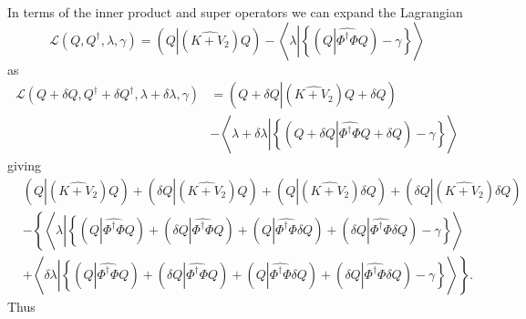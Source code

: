 \documentclass[aps,preprint]{revtex4}%
\begin{document}
In terms of the inner product and super operators we can expand the
Lagrangian
\begin{equation}
\mathcal{L}\left(  Q,Q^{\dagger},\lambda,\gamma\right)  =\left(  Q\left\vert
\left(  \widehat{K+V_{2}}\right)  Q\right.  \right)  -\left\langle
\lambda\left\vert \left\{  \left(  Q\left\vert \widehat{\Phi^{\dagger}\Phi
}Q\right.  \right)  -\gamma\right\}  \right.  \right\rangle
\end{equation}
as
\begin{align}
\mathcal{L}\left(  Q+\delta Q,Q^{\dagger}+\delta Q^{\dagger},\lambda
+\delta\lambda,\gamma\right)   &  =\left(  Q+\delta Q\left\vert \left(
\widehat{K+V_{2}}\right)  Q+\delta Q\right.  \right) \nonumber\\
&  -\left\langle \lambda+\delta\lambda\left\vert \left\{  \left(  Q+\delta
Q\left\vert \widehat{\Phi^{\dagger}\Phi}Q+\delta Q\right.  \right)
-\gamma\right\}  \right.  \right\rangle
\end{align}
giving
\begin{align}
&  \left(  Q\left\vert \left(  \widehat{K+V_{2}}\right)  Q\right.  \right)
+\left(  \delta Q\left\vert \left(  \widehat{K+V_{2}}\right)  Q\right.
\right)  +\left(  Q\left\vert \left(  \widehat{K+V_{2}}\right)  \delta
Q\right.  \right)  +\left(  \delta Q\left\vert \left(  \widehat{K+V_{2}%
}\right)  \delta Q\right.  \right) \nonumber\\
&  -\left\{  \left\langle \lambda\left\vert \left\{  \left(  Q\left\vert
\widehat{\Phi^{\dagger}\Phi}Q\right.  \right)  +\left(  \delta Q\left\vert
\widehat{\Phi^{\dagger}\Phi}Q\right.  \right)  +\left(  Q\left\vert
\widehat{\Phi^{\dagger}\Phi}\delta Q\right.  \right)  +\left(  \delta
Q\left\vert \widehat{\Phi^{\dagger}\Phi}\delta Q\right.  \right)
-\gamma\right\}  \right.  \right\rangle \right. \nonumber\\
&  \left.  +\left\langle \delta\lambda\left\vert \left\{  \left(  Q\left\vert
\widehat{\Phi^{\dagger}\Phi}Q\right.  \right)  +\left(  \delta Q\left\vert
\widehat{\Phi^{\dagger}\Phi}Q\right.  \right)  +\left(  Q\left\vert
\widehat{\Phi^{\dagger}\Phi}\delta Q\right.  \right)  +\left(  \delta
Q\left\vert \widehat{\Phi^{\dagger}\Phi}\delta Q\right.  \right)
-\gamma\right\}  \right.  \right\rangle \right\}  .
\end{align}
Thus
\end{document}
